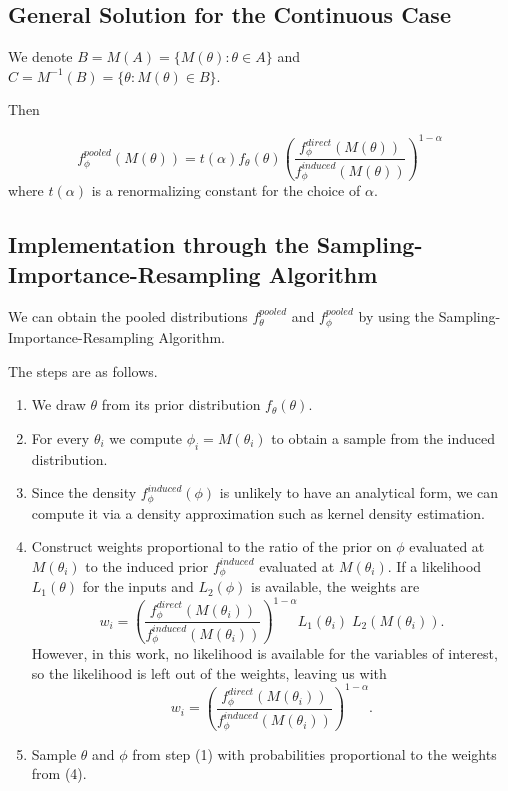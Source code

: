 \documentclass[12pt,twoside]{smiththesis}
\providecommand{\tightlist}{%
  \setlength{\itemsep}{0pt}\setlength{\parskip}{0pt}}
\begin{document}
\hypertarget{general-solution-for-the-continuous-case}{%
\subsection{General Solution for the Continuous Case}\label{general-solution-for-the-continuous-case}}

We denote \(B = M(A) = \{M(\theta) : \theta \in A \}\) and \(C = M^{-1}(B) = \{\theta: M(\theta) \in B \}\).

Then

\[
f_\phi^{pooled} (M(\theta)) =t({\alpha}) f_\theta(\theta) \left( \frac{f_\phi^{direct}(M(\theta))}{f_\phi^{induced}(M(\theta))} \right)^{1-\alpha} \tag{2}
\]
where \(t({\alpha})\) is a renormalizing constant for the choice of \(\alpha\).

\hypertarget{implementation-through-the-sampling-importance-resampling-algorithm}{%
\subsection{Implementation through the Sampling-Importance-Resampling Algorithm}\label{implementation-through-the-sampling-importance-resampling-algorithm}}

We can obtain the pooled distributions \(f^{pooled}_\theta\) and \(f^{pooled}_\phi\) by using the Sampling-Importance-Resampling Algorithm.

The steps are as follows.
\begin{enumerate}
\def\labelenumi{\arabic{enumi}.}
\tightlist
\item
  We draw \(\theta\) from its prior distribution \(f_\theta(\theta)\).
\item
  For every \(\theta_i\) we compute \(\phi_i = M(\theta_i)\) to obtain a sample from the induced distribution.
\item
  Since the density \(f_\phi^{induced}(\phi)\) is unlikely to have an analytical form, we can compute it via a density approximation such as kernel density estimation.
\item
  Construct weights proportional to the ratio of the prior on \(\phi\) evaluated at \(M(\theta_i)\) to the induced prior \(f_\phi^{induced}\) evaluated at \(M(\theta_i)\). If a likelihood \(L_1(\theta)\) for the inputs and \(L_2(\phi)\) is available, the weights are
  \[w_i = \left( \frac{f_\phi^{direct}(M(\theta_i))}{f_\phi^{induced}(M(\theta_i))} \right)^{1-\alpha}L_1(\theta_i) \; L_2(M(\theta_i)).\]
  However, in this work, no likelihood is available for the variables of interest, so the likelihood is left out of the weights, leaving us with
  \[w_i = \left( \frac{f_\phi^{direct}(M(\theta_i))}{f_\phi^{induced}(M(\theta_i))} \right)^{1-\alpha}.\]
\item
  Sample \(\theta\) and \(\phi\) from step (1) with probabilities proportional to the weights from (4).
\end{enumerate}
\newpage
\end{document}
